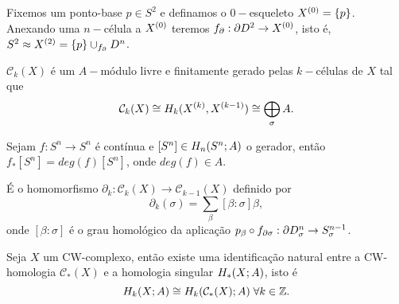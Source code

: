 \documentclass{beamer}
\begin{document}
	
	\begin{frame}
		\begin{exemplo}[2-esfera]
			Fixemos um ponto-base $p \in S^{2}$ e definamos o $0-$esqueleto $X^{(0)}=\{p\}$. Anexando uma $n-$célula a $X^{(0)}$ teremos $f_{\partial}: \partial D^{2} \to X^{(0)}$, isto é, $S^{2} \approx X^{(2)} = \{p\}\cup_{f_{\partial}} D^{n}_{}$.
		\end{exemplo}
		
	\end{frame}
	
	\begin{frame}
		
		\begin{lema}
			$\mathcal{C}_{k}(X)$ é um $A-$módulo livre e finitamente gerado pelas $k-$células de $X$ tal que 
			$$
			\mathcal{C}_{k}(X) \cong 
			H_{k}(X^{(k)}, X^{(k-1)}) \cong \bigoplus \limits_{\sigma} A.
			$$
		\end{lema}
		
		\begin{definicao}
			Sejam $f: S^{n} \to S^{n}$ é contínua e $[S^{n}] \in H_{n}(S^{n};A)$ o gerador, então $f_{*}[S^{n}] = deg(f)[S^{n}]$, onde $deg(f) \in A$.
		\end{definicao}
		
		\pause
		\begin{teorema}[CW-bordo]
			É o homomorfismo $\partial_{k}:\mathcal{C}_{k}(X)\to \mathcal{C}_{k-1}(X)$ definido por
			$$
			\partial_{k}(\sigma) = \sum_{\beta}[\beta:\sigma]\beta,
			$$
			onde $[\beta:\sigma]$ é o grau homológico da aplicação $p_{\beta} \circ f_{\partial\sigma}:\partial D^{n}_{\sigma} \to S^{n-1}_{\sigma}$.
		\end{teorema}
		
	\end{frame}

	\begin{frame}
		\begin{teorema}[CW-homologia]
			Seja $X$ um CW-complexo, então existe uma identificação natural entre a CW-homologia $\mathcal{C}_{*}(X)$ e a homologia singular $H_{*}(X;A)$, isto é 
			$$
			H_{k}(X;A) \cong H_{k}(\mathcal{C}_{*}(X);A)\; \forall k \in \mathbb{Z}.
			$$
		\end{teorema}
		
	\end{frame}
\end{document}
